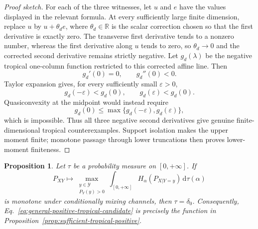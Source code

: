 \documentclass[aps,pra,11pt,onecolumn,nofootinbib,tightenlines]{revtex4-2}
\newtheorem{proposition}[theorem]{Proposition}
\theoremstyle{definition}
\newcommand{\R}{\mathbb{R}}
\newcommand{\Y}{\mathcal{Y}}
\def\d{\mathrm{d}}
\begin{document}
\begin{proof}[Proof sketch]
For each of the three witnesses, let $u$ and $e$ have the values displayed in
the relevant formula.  At every sufficiently large finite dimension, replace
$u$ by $u+\theta_de$, where $\theta_d\in\R$ is the scalar correction chosen
so that the first derivative is exactly zero.  The transverse first derivative
tends to a nonzero number,
whereas the first derivative along $u$ tends to zero, so $\theta_d\to0$ and the
corrected second derivative remains strictly negative.  Let $g_d(\lambda)$ be
the negative tropical one-column function restricted to this corrected affine
line.  Then
\begin{equation}
g_d'(0)=0,
\qquad
g_d''(0)<0.
\label{eq:tropical-exact-negative-curvature}
\end{equation}
Taylor expansion gives, for every sufficiently small $\varepsilon>0$,
\begin{equation}
g_d(-\varepsilon)<g_d(0),
\qquad
g_d(\varepsilon)<g_d(0).
\label{eq:tropical-endpoint-strict-inequalities}
\end{equation}
Quasiconvexity at the midpoint would instead require
\begin{equation}
g_d(0)\leq
\max\{g_d(-\varepsilon),g_d(\varepsilon)\},
\label{eq:tropical-quasiconvex-midpoint}
\end{equation}
which is impossible.  Thus all three negative second derivatives give genuine
finite-dimensional tropical counterexamples.  Support isolation makes the
upper moment finite; monotone passage through lower truncations then proves
lower-moment finiteness.
\end{proof}

\begin{proposition}
\label{prop:positive-tropical-necessary}
Let $\tau$ be a probability measure on $[0,+\infty]$.  If
\begin{equation}
\label{eq:general-positive-tropical-candidate}
P_{XY}\longmapsto
\max_{\substack{y\in\Y\\P_Y(y)>0}}
\int_{[0,+\infty]}H_\alpha(P_{X|Y=y})\,\d\tau(\alpha)
\end{equation}
is monotone under conditionally mixing channels, then $\tau=\delta_0$.
Consequently, Eq.~\eqref{eq:general-positive-tropical-candidate} is precisely
the function in Proposition~\ref{prop:sufficient-tropical-positive}.
\end{proposition}
\end{document}
